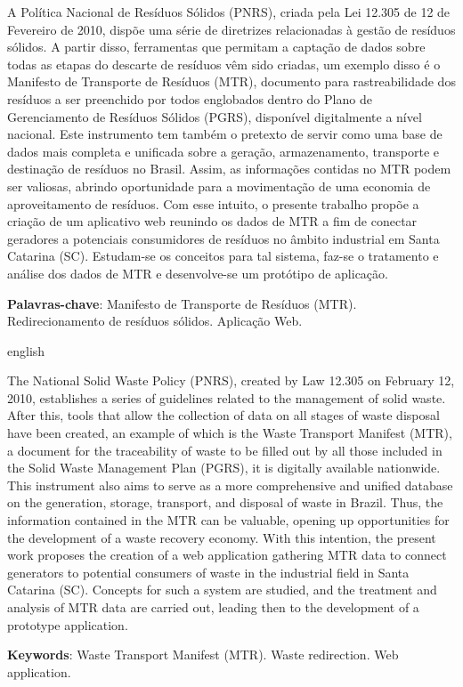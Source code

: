 \setlength{\absparsep}{18pt} %
\begin{resumo}
	\SingleSpacing

	A Política Nacional de Resíduos Sólidos (PNRS), criada pela Lei 12.305 de 12
	de Fevereiro de 2010, dispõe uma série de diretrizes relacionadas à gestão de resíduos sólidos. A partir disso, ferramentas que permitam a captação de dados sobre todas as etapas do descarte de resíduos vêm sido criadas, um exemplo disso é o Manifesto de Transporte de Resíduos (MTR), documento para rastreabilidade dos resíduos a ser preenchido por todos englobados dentro do Plano de Gerenciamento de Resíduos Sólidos (PGRS), disponível digitalmente a nível nacional. Este instrumento tem também o pretexto de servir como uma base de dados mais completa e unificada sobre a geração, armazenamento, transporte e destinação de resíduos no Brasil. Assim, as informações contidas no MTR podem ser valiosas, abrindo oportunidade para a movimentação de uma economia de aproveitamento de resíduos. Com esse intuito, o presente trabalho propõe a criação de um aplicativo web reunindo os dados de MTR a fim de conectar geradores a potenciais consumidores de resíduos no âmbito industrial em Santa Catarina (SC). Estudam-se os conceitos para tal sistema, faz-se o tratamento e análise dos dados de MTR e desenvolve-se um protótipo de aplicação.
	
	\textbf{Palavras-chave}: Manifesto de Transporte de Resíduos (MTR). Redirecionamento de resíduos sólidos. Aplicação Web.
\end{resumo}

\begin{resumo}[Abstract]
	\SingleSpacing
	\begin{otherlanguage*}{english}

		The National Solid Waste Policy (PNRS), created by Law 12.305 on February 12, 2010, establishes a series of guidelines related to the management of solid waste. After this, tools that allow the collection of data on all stages of waste disposal have been created, an example of which is the Waste Transport Manifest (MTR), a document for the traceability of waste to be filled out by all those included in the Solid Waste Management Plan (PGRS), it is digitally available nationwide. This instrument also aims to serve as a more comprehensive and unified database on the generation, storage, transport, and disposal of waste in Brazil. Thus, the information contained in the MTR can be valuable, opening up opportunities for the development of a waste recovery economy. With this intention, the present work proposes the creation of a web application gathering MTR data to connect generators to potential consumers of waste in the industrial field in Santa Catarina (SC). Concepts for such a system are studied, and the treatment and analysis of MTR data are carried out, leading then to the development of a prototype application.
		
		\textbf{Keywords}: Waste Transport Manifest (MTR). Waste redirection. Web application.
	\end{otherlanguage*}
\end{resumo}

